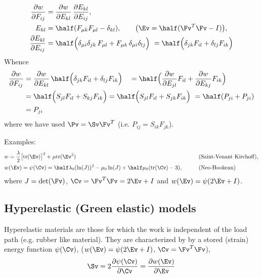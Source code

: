 \begin{align*}
    \frac{\partial w}{\partial F_{ij}} &= \frac{\partial w}{\partial E_{kl}}\, \frac{\partial E_{kl}}{\partial E_{ij}} , \\
     E_{kl} &= \half( F_{\mu k} F_{\mu l} - \delta_{kl} ), \qquad\big( \Ev=\half(\Fv^T \Fv - I)\big) , \\
    \frac{\partial E_{kl}}{\partial E_{ij}} &= \half\Big( \delta_{\mu i}\delta_{j k} \,F_{\mu l} + F_{\mu k}\,\delta_{\mu i}\delta_{l j} \Big) 
              ~= \half\Big( \delta_{j k} F_{i l} + \delta_{l j}F_{i k} \Big) 
\end{align*}
Whence
\begin{align*}
    \frac{\partial w}{\partial F_{ij}} &=\frac{\partial w}{\partial E_{kl}}\, \half\Big( \delta_{j k} F_{i l} + \delta_{l j}F_{i k} \Big) \quad
       = \half\Big( \frac{\partial w}{\partial E_{jl}} F_{i l} + \frac{\partial w}{\partial E_{kj}} F_{i k} \Big) \\
       &= \half\Big( S_{jl}  F_{i l}  + S_{kj} F_{i k} \Big) = \half\Big( S_{jl}  F_{i l}  + S_{jk} F_{i k} \Big)  ~= \half( P_{ji} + P_{ji} )\\
       &= P_{ji}
\end{align*}
where we have used $\Pv=\Sv \Fv^T$ (i.e. $P_{ij}=S_{ik} F_{jk}$). 

Examples:
\begin{alignat*}{3}
&   w = \frac{\lambda}{2} \big[\tr(\Ev)\big]^2 + \mu \tr(\Ev^2)  \qquad && \text{(Saint-Venant Kirchoff)}, \\
&  w(\Ev)= \psi(\Cv) = \half\lambda_0 (\ln(J))^2 - \mu_0 \ln(J) + \half \mu_0(\tr(\Cv)-3), \qquad && \text{(Neo-Hookean)}
\end{alignat*}
where $J=\det(\Fv)$, $\Cv=\Fv^T\Fv=2\Ev+I$ and $w(\Ev)=\psi(2\Ev+I)$.

\clearpage
\subsection{Hyperelastic (Green elastic) models}

Hyperelastic materials are those for which the work is independent of the load path (e.g. rubber like material).
They are characterized by by a stored (strain) energy function $\psi(\Cv)$, ($w(\Ev)=\psi(2\Ev+I)$, $\Cv=\Fv^T\Fv$), 
\begin{align*}
    \Sv = 2 \frac{\partial \psi(\Cv)}{\partial \Cv} = \frac{\partial w(\Ev)}{\partial\Ev}
\end{align*}

